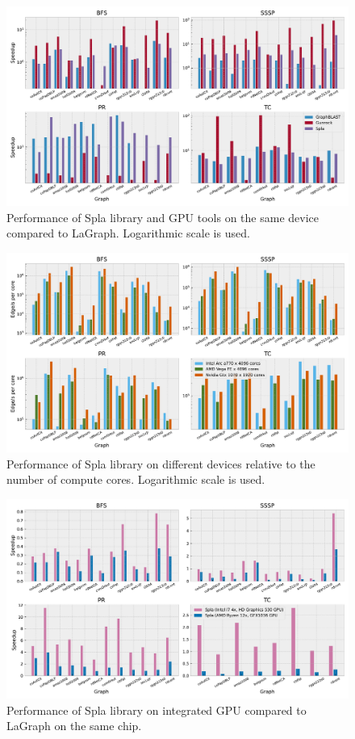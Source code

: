 \begin{figure}[tbp]
\centering
\includegraphics[width=1.0\linewidth]{plots/rq1_rel.pdf}
\caption{Performance of Spla library and GPU tools on the same device compared to LaGraph. Logarithmic scale is used.}
\label{fig:rq1_chart}
\end{figure}

\begin{figure}[tbp]
\centering
\includegraphics[width=1.0\linewidth]{plots/rq2_cores.pdf}
\caption{Performance of Spla library on different devices relative to the number of compute cores. Logarithmic scale is used.}
\label{fig:rq2_chart}
\end{figure}

\begin{figure}[tbp]
\centering
\includegraphics[width=1.0\linewidth]{plots/rq3_int.pdf}
\caption{Performance of Spla library on integrated GPU compared to LaGraph on the same chip.}
\label{fig:rq3_chart}
\end{figure}

